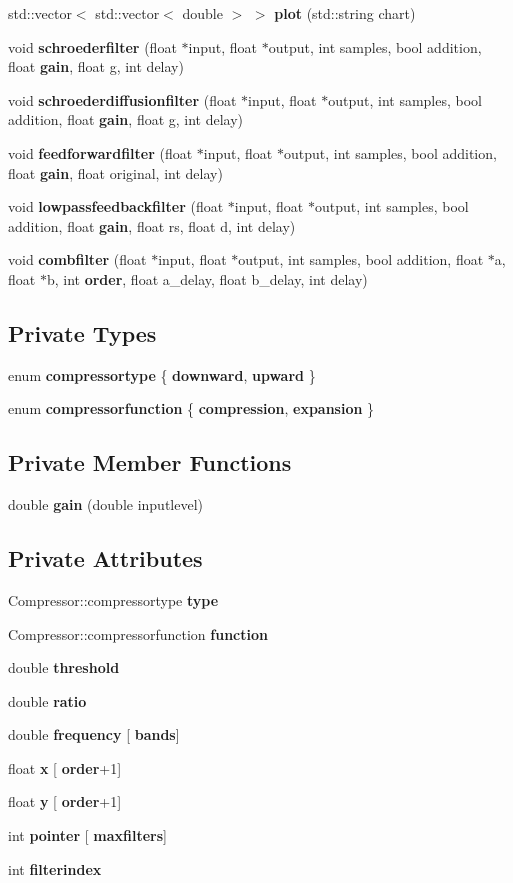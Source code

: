 \begin{DoxyCompactItemize}
\item 
std\+::vector$<$ std\+::vector$<$ double $>$ $>$ \textbf{ plot} (std\+::string chart)
\item 
void \textbf{ schroederfilter} (float $\ast$input, float $\ast$output, int samples, bool addition, float \textbf{ gain}, float g, int delay)
\item 
void \textbf{ schroederdiffusionfilter} (float $\ast$input, float $\ast$output, int samples, bool addition, float \textbf{ gain}, float g, int delay)
\item 
void \textbf{ feedforwardfilter} (float $\ast$input, float $\ast$output, int samples, bool addition, float \textbf{ gain}, float original, int delay)
\item 
void \textbf{ lowpassfeedbackfilter} (float $\ast$input, float $\ast$output, int samples, bool addition, float \textbf{ gain}, float rs, float d, int delay)
\item 
void \textbf{ combfilter} (float $\ast$input, float $\ast$output, int samples, bool addition, float $\ast$a, float $\ast$b, int \textbf{ order}, float a\+\_\+delay, float b\+\_\+delay, int delay)
\end{DoxyCompactItemize}
\subsection*{Private Types}
\begin{DoxyCompactItemize}
\item 
enum \textbf{ compressortype} \{ \textbf{ downward}, 
\textbf{ upward}
 \}
\item 
enum \textbf{ compressorfunction} \{ \textbf{ compression}, 
\textbf{ expansion}
 \}
\end{DoxyCompactItemize}
\subsection*{Private Member Functions}
\begin{DoxyCompactItemize}
\item 
double \textbf{ gain} (double inputlevel)
\end{DoxyCompactItemize}
\subsection*{Private Attributes}
\begin{DoxyCompactItemize}
\item 
Compressor\+::compressortype \textbf{ type}
\item 
Compressor\+::compressorfunction \textbf{ function}
\item 
double \textbf{ threshold}
\item 
double \textbf{ ratio}
\item 
double \textbf{ frequency} [\textbf{ bands}]
\item 
float \textbf{ x} [\textbf{ order}+1]
\item 
float \textbf{ y} [\textbf{ order}+1]
\item 
int \textbf{ pointer} [\textbf{ maxfilters}]
\item 
int \textbf{ filterindex}
\end{DoxyCompactItemize}
